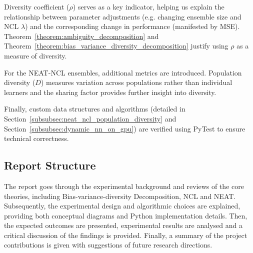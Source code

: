 Diversity coefficient ($\rho$) serves as a key indicator, helping us explain the relationship between parameter adjustments (e.g. changing ensemble size and NCL $\lambda$) and the corresponding change in performance (manifested by MSE). Theorem~\ref{theorem:ambiguity_decomposition} and Theorem~\ref{theorem:bias_variance_diversity_decomposition} justify using $\rho$ as a measure of diversity. 

For the NEAT-NCL ensembles, additional metrics are introduced. Population diversity ($D$) measures variation across populations rather than individual learners and the sharing factor provides further insight into diversity. 

Finally, custom data structures and algorithms (detailed in Section~\ref{subsubsec:neat_ncl_population_diversity} and Section~\ref{subsubsec:dynamic_nn_on_gpu}) are verified using PyTest to ensure technical correctness. 


\subsection{Report Structure}
The report goes through the experimental background and reviews of the core theories, including Bias-variance-diversity Decomposition, NCL and NEAT. Subsequently, the experimental design and algorithmic choices are explained, providing both conceptual diagrams and Python implementation details. Then, the expected outcomes are presented, experimental results are analysed and a critical discussion of the findings is provided. Finally, a summary of the project contributions is given with suggestions of future research directions. 